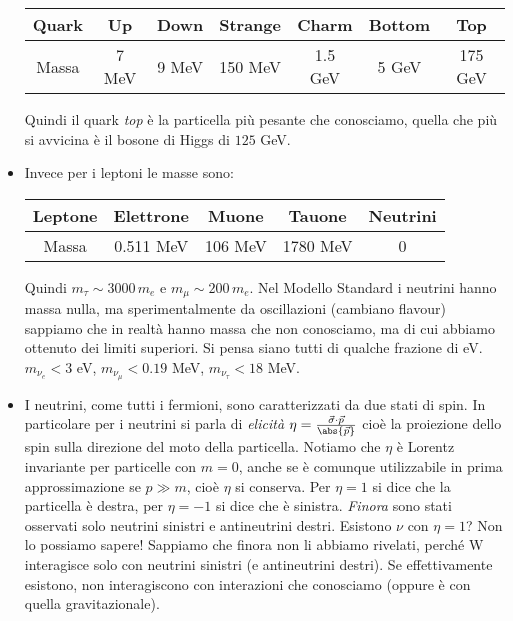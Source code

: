 \begin{itemize}
    \begin{center}
        \begin{tabular}{|c|c|c|c|c|c|c|}
            \hline
            Quark & Up & Down & Strange & Charm & Bottom & Top \\
            \hline
            Massa & 7 MeV & 9 MeV & 150 MeV & 1.5 GeV & 5 GeV & 175 GeV \\
            \hline
        \end{tabular}
    \end{center}

    Quindi il quark \textit{top} è la particella più pesante che conosciamo, quella che più si avvicina è il bosone di Higgs di $125$ GeV.
    \item Invece per i leptoni le masse sono:
    
    \begin{center}
        \begin{tabular}{|c|c|c|c|c|}
            \hline
            Leptone & Elettrone & Muone & Tauone & Neutrini \\
            \hline
            Massa & 0.511 MeV & 106 MeV & 1780 MeV & 0  \\
            \hline
        \end{tabular}
    \end{center}
    Quindi $m_\tau\sim3000\,m_e$ e $m_\mu\sim200\,m_e$. Nel Modello Standard i neutrini hanno massa nulla, ma sperimentalmente da oscillazioni (cambiano flavour) sappiamo che in realtà hanno massa che non conosciamo, ma di cui abbiamo ottenuto dei limiti superiori. Si pensa siano tutti di qualche frazione di eV. $m_{\nu_e}<3$ eV, $m_{\nu_\mu}<0.19$ MeV, $m_{\nu_\tau}<18$ MeV.
    \item I neutrini, come tutti i fermioni, sono caratterizzati da due stati di spin. In particolare per i neutrini si parla di \textit{elicità} $\eta=\frac{\vec\sigma\cdot\vec p}{\abs{\vec p}}$ cioè la proiezione dello spin sulla direzione del moto della particella. Notiamo che $\eta$ è Lorentz invariante per particelle con $m=0$, anche se è comunque utilizzabile in prima approssimazione se $p\gg m$, cioè $\eta$ si conserva. Per $\eta=1$ si dice che la particella è destra, per $\eta=-1$ si dice che è sinistra. \textit{Finora} sono stati osservati solo neutrini sinistri e antineutrini destri. Esistono $\nu$ con $\eta=1$? Non lo possiamo sapere! Sappiamo che finora non li abbiamo rivelati, perché W interagisce solo con neutrini sinistri (e antineutrini destri). Se effettivamente esistono, non interagiscono con interazioni che conosciamo (oppure è con quella gravitazionale).
\end{itemize}